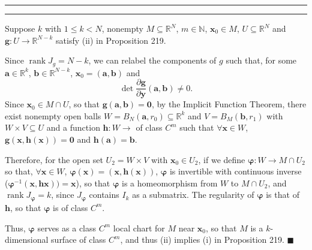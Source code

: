 \documentclass[11pt]{article}
\newcounter{questionCounter}
\newcounter{partCounter}[questionCounter]
\newenvironment{question}[2][\arabic{questionCounter}]{%
    \setcounter{partCounter}{0}%
    \vspace{.25in} \hrule \vspace{0.5em}%
        \noindent{\bf #2}%
    \vspace{0.8em} \hrule \vspace{.10in}%
    \addtocounter{questionCounter}{1}%
}{}
\renewcommand{\qed}{\quad $\blacksquare$}
\newcommand{\bvarphi}{\boldsymbol{\varphi}}
\newcommand{\rank}{\operatorname{rank}}
\newcommand{\bzero}{\mathbf{0}}
\newcommand{\ba}{\mathbf{a}}
\newcommand{\bb}{\mathbf{b}}
\newcommand{\bx}{\mathbf{x}}
\newcommand{\by}{\mathbf{y}}
\newcommand{\bfg}{\mathbf{g}}
\newcommand{\bfh}{\mathbf{h}}
\begin{document}
\newpage
\begin{question}{Problem 2}
Suppose $k$ with $1 \leq k < N$, nonempty $M \subseteq \mathbb{R}^N$,
$m \in \mathbb{N}$, $\bx_0 \in M$, $U \subseteq \mathbb{R}^N$ and
$\bfg: U \rightarrow \mathbb{R}^{N - k}$ satisfy (ii) in Proposition 219.

Since $\rank J_g = N - k$,
we can relabel the components of $g$ such that, for some
$\ba \in \mathbb{R}^k$, $\bb \in \mathbb{R}^{N - k}$, $\bx_0 = (\ba,\bb)$ and
\[\det \frac{\partial \bfg}{\partial \by}(\ba,\bb) \neq 0.\] Since
$\bx_0 \in M \cap U$, so that $\bfg(\ba,\bb) = \bzero$, by the Implicit
Function Theorem, there exist
nonempty open balls $W = B_N(\ba,r_0) \subseteq \mathbb{R}^k$ and
$V = B_M(\bb,r_1)$ with $W \times V \subseteq U$ and a function
$\bfh: W \rightarrow $ of class $C^m$ such that $\forall \bx \in W$,
$\bfg(\bx,\bfh(\bx)) = \bzero$ and $\bfh(\ba) = \bb$.

Therefore, for the open set $U_2 = W \times V$ with $\bx_0 \in U_2$,
if we define $\bvarphi:W \rightarrow M \cap U_2$ so that,
$\forall \bx \in W$, $\bvarphi(\bx) = (\bx,\bfh(\bx))$, $\bvarphi$ is
invertible with continuous inverse ($\bvarphi^{-1}(\bx,\bfh\bx)) = \bx$), so
that $\bvarphi$ is a homeomorphism from $W$ to $M \cap U_2$, and
$\rank J_{\bvarphi} = k$, since $J_{\bvarphi}$ contains $I_k$ as a submatrix.
The regularity of $\bvarphi$ is that of $\bfh$, so that $\bvarphi$ is of class
$C^m$.

Thus, $\bvarphi$ serves as a class $C^m$ local chart for $M$ near $\bx_0$, so
that $M$ is a $k$-dimensional surface of class $C^m$, and thus (ii) implies
(i) in Proposition 219. \qed
\end{question}
\end{document}
